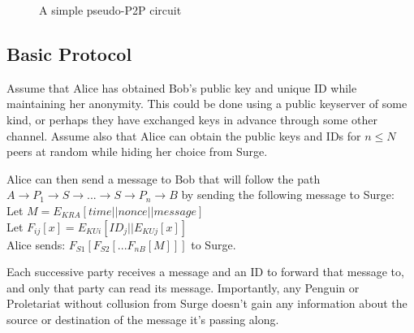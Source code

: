 \documentclass[twocolumn,11pt,english]{article}
\begin{document}
\begin{figure}[ht]
  \begin{center}
  \end{center}
  \caption{A simple pseudo-P2P circuit}
\end{figure}


\subsection{Basic Protocol}
Assume that Alice has obtained Bob's public key and unique ID while maintaining her anonymity. This could be done using a public keyserver of some kind, or perhaps they have exchanged keys in advance through some other channel. Assume also that Alice can obtain the public keys and IDs for $n \le N$ peers at random while hiding her choice from Surge. 

Alice can then send a message to Bob that will follow the path $A \rightarrow P_1 \rightarrow S \rightarrow ... \rightarrow S \rightarrow P_n \rightarrow B$ by sending the following message to Surge: 
\\
Let $M = E_{KRA}[  time || nonce || message ]$
\\Let $F_{ij}[x] = E_{KUi}[ ID_j || E_{KUj}[ x ] ]$
\\
Alice sends: $F_{S1}[F_{S2}[...F_{nB}[ M ]]]$ to Surge. 

Each successive party receives a message and an ID to forward that message to, and only that party can read its message. Importantly, any Penguin or Proletariat without collusion from Surge doesn't gain any information about the source or destination of the message it's passing along. 
\end{document}
